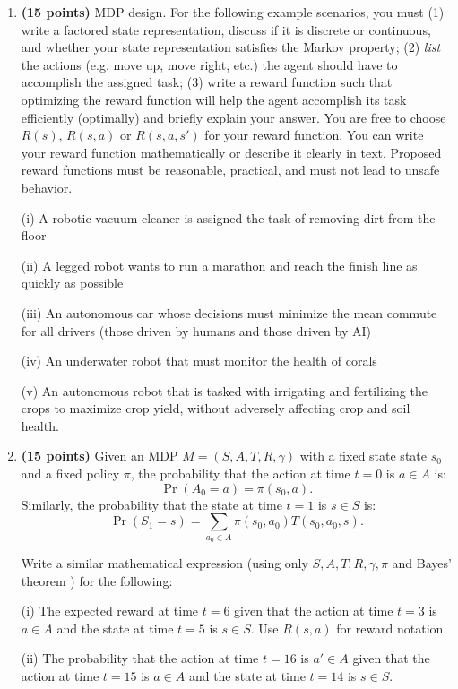 \documentclass[11pt]{article}
\begin{document}
	\begin{enumerate}
	
	\item \textbf{(15 points)} MDP design.  For the following example scenarios, you must (1) write a factored state representation, discuss if it is discrete or continuous, and whether your state representation satisfies the Markov property; (2) \textit{list} the actions (e.g.  move up, move right, etc.) the agent should have to accomplish the assigned task;  (3) write a reward function such that optimizing the reward function will help the agent accomplish its task efficiently (optimally)  and briefly explain your answer. You are free to choose $R(s)$, $R(s,a)$ or $R(s,a,s')$ for your reward function. You can write your reward function mathematically or describe it clearly in text.  Proposed reward functions must be reasonable, practical, and must not lead to unsafe behavior. 
	
	(i) A robotic vacuum cleaner is assigned the task of removing dirt from the floor
	
	(ii) A legged robot wants to run a marathon and reach the finish line as quickly as possible
	
	(iii) An autonomous car whose decisions must minimize the mean commute for all drivers (those driven by humans and those driven by AI)
	
	(iv) An underwater robot that must monitor the health of corals
	
	(v) An autonomous robot that is tasked with irrigating and fertilizing the crops to maximize crop yield, without adversely affecting crop and soil health. 
	
	\item \textbf{(15 points)} Given an MDP $M = (S,A,T,R,\gamma)$ with a fixed state state $s_0$ and a fixed policy $\pi$, the probability that the action at time $t=0$ is $a\in A$ is:
	\[ \Pr(A_0 =a) = \pi(s_0, a). \] Similarly, the probability that the state at time $t=1$ is $s\in S$ is: \[ \Pr(S_1=s) = \sum_{a_0 \in A} \pi(s_0,a_0) T(s_0,a_0,s).\]
	
	Write a similar mathematical expression (using only $S,A,T,R,\gamma,\pi$ and Bayes' theorem ) for the following:
	
		(i) The  expected reward at time $t=6$ given that the action at time $t=3$ is $a\in A$ and the state at time $t=5$ is $s \in S$. Use $R(s,a)$ for reward notation.
		
		(ii) The probability that the action at time $t=16$ is $a' \in A$ given that the action at time $t=15$ is $a\in A$ and the state at time $t=14$ is $s \in S$. 


\end{enumerate}
\end{document}
